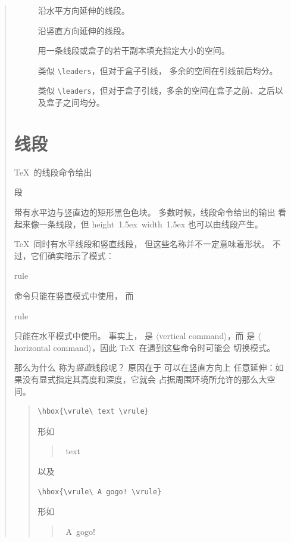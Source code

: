 \documentclass[a4paper]{rapport3}
\makeatletter
\def\gr#1{$\langle$#1$\rangle$}\def\key#1{{\tt#1}}
\newenvironment{disp}{\begin{quotation}}{\end{quotation}}
\newenvironment{example}{\begin{quotation}}{\end{quotation}}
\newenvironment{inventory}{\begin{description}}{\end{description}}
\def\term#1\par{\index{#1}}
\def\cstoidx#1\par{\index{#1@\cs{#1}}}
\def\csidx#1{\cstoidx #1\par\cs{#1}}
\makeatother
\begin{document}
\begin{disp}
\begin{inventory}
\item [] 
      沿水平方向延伸的线段。

\item [] 
      沿竖直方向延伸的线段。

\item [] 
      用一条线段或盒子的若干副本填充指定大小的空间。

\item [] 
      类似 \verb=\leaders=，但对于盒子引线，
      多余的空间在引线前后均分。

\item [] 
      类似 \verb=\leaders=，但对于盒子引线，多余的空间在盒子之前、之后以及盒子之间均分。

\end{inventory}

\section{线段}

\TeX\ 的线段命令给出
\term 线段\par
带有水平边与竖直边的矩形黑色色块。
多数时候，线段命令给出的输出
看起来像一条线段，但 \hbox{\vrule height 1.5ex width 1.5ex}
也可以由线段产生。

\TeX\ 同时有水平线段和竖直线段，
但这些名称并不一定意味着形状。
不过，它们确实暗示了模式：
\csidx{hrule} 命令只能在竖直模式中使用，
而 \csidx{vrule} 只能在水平模式中使用。
事实上， 是 \gr{vertical command}，而 
是 \gr{horizontal command}，因此 \TeX\ 在遇到这些命令时可能会
切换模式。

那么为什么  称为{\em 竖直\/}线段呢？
原因在于  可以在竖直方向上
任意延伸：如果没有显式指定其高度和深度，它就会
占据周围环境所允许的那么大空间\altt。

\begin{example}
\begin{verbatim}
\hbox{\vrule\ text \vrule}
\end{verbatim}
形如 \begin{disp}\leavevmode\hbox{\vrule\ text \vrule}\end{disp}
以及 \begin{verbatim}
\hbox{\vrule\ A gogo! \vrule}
\end{verbatim}
形如
\begin{disp}\leavevmode\hbox{\vrule\ A gogo! \vrule}\end{disp}
\end{example}


\end{disp}
\end{document}
